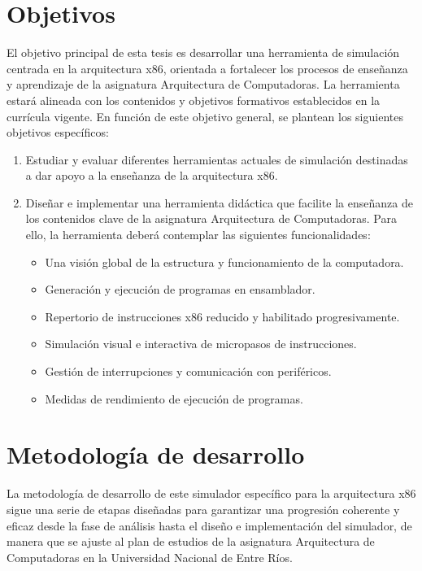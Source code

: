 \documentclass[12pt,oneside]{templates/unerthesis}
\providecommand{\tightlist}{%
  \setlength{\itemsep}{0pt}\setlength{\parskip}{0pt}}
\begin{document}
\hypertarget{objetivos}{%
\section{Objetivos}\label{objetivos}}

El objetivo principal de esta tesis es desarrollar una herramienta de simulación centrada en la arquitectura x86, orientada a fortalecer los procesos de enseñanza y aprendizaje de la asignatura Arquitectura de Computadoras. La herramienta estará alineada con los contenidos y objetivos formativos establecidos en la currícula vigente. En función de este objetivo general, se plantean los siguientes objetivos específicos:

\begin{enumerate}
\def\labelenumi{\arabic{enumi}.}
\tightlist
\item
  Estudiar y evaluar diferentes herramientas actuales de simulación destinadas a dar apoyo a la enseñanza de la arquitectura x86.
\item
  Diseñar e implementar una herramienta didáctica que facilite la enseñanza de los contenidos clave de la asignatura Arquitectura de Computadoras. Para ello, la herramienta deberá contemplar las siguientes funcionalidades:

  \begin{itemize}
  \tightlist
  \item
    Una visión global de la estructura y funcionamiento de la computadora.
  \item
    Generación y ejecución de programas en ensamblador.
  \item
    Repertorio de instrucciones x86 reducido y habilitado progresivamente.
  \item
    Simulación visual e interactiva de micropasos de instrucciones.
  \item
    Gestión de interrupciones y comunicación con periféricos.
  \item
    Medidas de rendimiento de ejecución de programas.
  \end{itemize}
\end{enumerate}

\hypertarget{metodologuxeda-de-desarrollo}{%
\section{Metodología de desarrollo}\label{metodologuxeda-de-desarrollo}}

La metodología de desarrollo de este simulador específico para la arquitectura x86 sigue una serie de etapas diseñadas para garantizar una progresión coherente y eficaz desde la fase de análisis hasta el diseño e implementación del simulador, de manera que se ajuste al plan de estudios de la asignatura Arquitectura de Computadoras en la Universidad Nacional de Entre Ríos.
\end{document}
